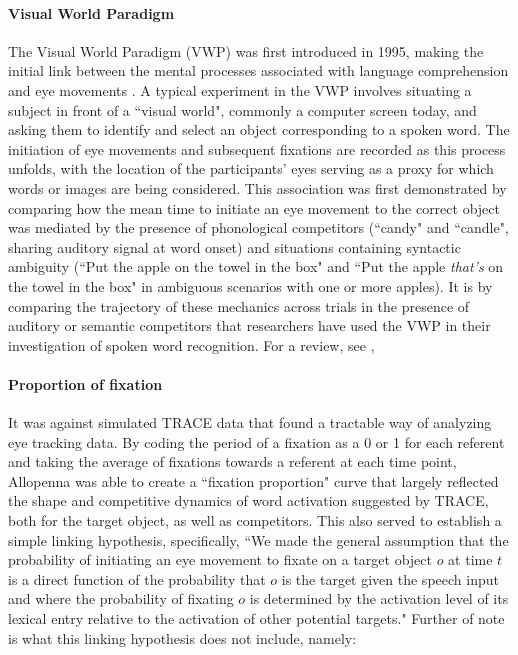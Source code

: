 \paragraph{Visual World Paradigm} The Visual World Paradigm (VWP) was first introduced in 1995, making the initial link between the mental processes associated with language comprehension and eye movements \citep{tanenhaus1995integration}. A typical experiment in the VWP involves situating a subject in front of a ``visual world", commonly a computer screen today, and asking them to identify and select an object corresponding to a spoken word. The initiation of eye movements and subsequent fixations are recorded as this process unfolds, with the location of the participants' eyes serving as a proxy for which words or images are being considered. This association was first demonstrated by comparing how the mean time to initiate an eye movement to the correct object was mediated by the presence of phonological competitors (``candy" and ``candle", sharing auditory signal at word onset) and situations containing syntactic ambiguity (``Put the apple on the towel in the box" and ``Put the apple \textit{that's} on the towel in the box" in ambiguous scenarios with one or more apples). It is by comparing the trajectory of these mechanics across trials in the presence of auditory or semantic competitors that researchers have used the VWP in their investigation of spoken word recognition. For a review, see \citet{Huettig2011}, \citet{salverda2017visual}




\paragraph{Proportion of fixation} It was against simulated TRACE data that \citet{allopenna1998tracking} found a tractable way of analyzing eye tracking data. By coding the period of a fixation as a 0 or 1 for each referent and taking the average of fixations towards a referent at each time point, Allopenna was able to create a ``fixation proportion" curve that largely reflected the shape and competitive dynamics of word activation suggested by TRACE, both for the target object, as well as competitors. This also served to establish a simple linking hypothesis, specifically, ``We made the general assumption that the probability of initiating an eye movement to fixate on a target object $o$ at time $t$ is a direct function of the probability that $o$ is the target given the speech input and where the probability of fixating $o$ is determined by the activation level of its lexical entry relative to the activation of other potential targets." Further of note is what this linking hypothesis does not include, namely:


